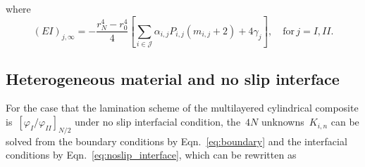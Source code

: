 \documentclass[preprint,10pt,times]{elsarticle}
\numberwithin{equation}{section}
\renewcommand{\>}{$\Rightarrow$}
\begin{document}
where
\begin{equation}
	(EI)_{j,\infty} = - \frac{r_N^4 - r_0^4}{4} \left[ \sum_{i \in \mathcal{J}} \alpha_{i,j} P_{i,j} (m_{i,j} + 2 ) + 4\gamma_j\right], \quad \text{for} \, j = I, II.
\end{equation}


\subsection{Heterogeneous material and no slip interface}
\label{sec:2mat_no_slip}
For the case that the lamination scheme of the multilayered cylindrical composite is~$[\varphi_I/\varphi_{II}]_{N/2}$ under no slip interfacial condition, the~$4N$ unknowns~$K_{i,n}$ can be solved from the boundary conditions by Eqn.~\eqref{eq:boundary} and the interfacial conditions by Eqn.~\eqref{eq:noslip_interface}, which can be rewritten as
\end{document}
